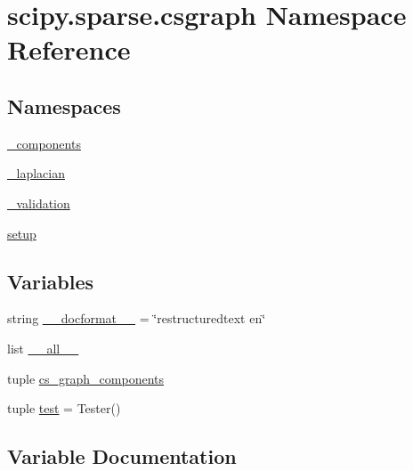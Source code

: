 \hypertarget{namespacescipy_1_1sparse_1_1csgraph}{}\section{scipy.\+sparse.\+csgraph Namespace Reference}
\label{namespacescipy_1_1sparse_1_1csgraph}
\subsection*{Namespaces}
\begin{DoxyCompactItemize}
\item 
 \hyperlink{namespacescipy_1_1sparse_1_1csgraph_1_1__components}{\+\_\+components}
\item 
 \hyperlink{namespacescipy_1_1sparse_1_1csgraph_1_1__laplacian}{\+\_\+laplacian}
\item 
 \hyperlink{namespacescipy_1_1sparse_1_1csgraph_1_1__validation}{\+\_\+validation}
\item 
 \hyperlink{namespacescipy_1_1sparse_1_1csgraph_1_1setup}{setup}
\end{DoxyCompactItemize}
\subsection*{Variables}
\begin{DoxyCompactItemize}
\item 
string \hyperlink{namespacescipy_1_1sparse_1_1csgraph_ad809c379a5b7654e8e0a794daad65293}{\+\_\+\+\_\+docformat\+\_\+\+\_\+} = \char`\"{}restructuredtext en\char`\"{}
\item 
list \hyperlink{namespacescipy_1_1sparse_1_1csgraph_a0d2763aed53deb59f8e760fcdd1b2c65}{\+\_\+\+\_\+all\+\_\+\+\_\+}
\item 
tuple \hyperlink{namespacescipy_1_1sparse_1_1csgraph_a5180c25e1d6d99f0df41c6127fac17d9}{cs\+\_\+graph\+\_\+components}
\item 
tuple \hyperlink{namespacescipy_1_1sparse_1_1csgraph_ad13a5a91bd84dd248acba206b634476d}{test} = Tester()
\end{DoxyCompactItemize}


\subsection{Variable Documentation}
\hypertarget{namespacescipy_1_1sparse_1_1csgraph_a0d2763aed53deb59f8e760fcdd1b2c65}{}
